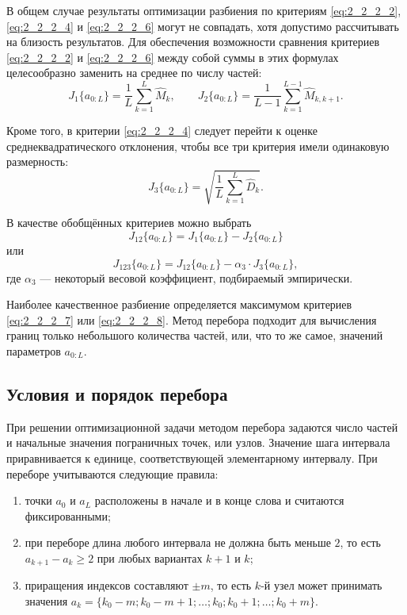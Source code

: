 В общем случае результаты оптимизации разбиения по критериям \eqref{eq:2_2_2_2}, \eqref{eq:2_2_2_4} и \eqref{eq:2_2_2_6} могут не совпадать, хотя допустимо рассчитывать на близость результатов.
Для обеспечения возможности сравнения критериев \eqref{eq:2_2_2_2} и \eqref{eq:2_2_2_6} между собой суммы в этих формулах целесообразно заменить на среднее по числу частей:
\begin{equation}
J_1\{a_{0:L}\} = \frac{1}{L} \sum_{k=1}^{L} \widehat{M}_k,\qquad
J_2\{a_{0:L}\} = \frac{1}{L-1} \sum_{k=1}^{L-1} \widehat{M}_{k,k+1}.
\end{equation}

Кроме того, в критерии \eqref{eq:2_2_2_4} следует перейти к оценке среднеквадратического отклонения, чтобы все три критерия имели одинаковую размерность:
\begin{equation}
J_3\{a_{0:L}\} = \sqrt{\frac{1}{L} \sum_{k=1}^{L} \widehat{D}_k}.
\end{equation}

В качестве обобщённых критериев можно выбрать
\begin{equation}\label{eq:2_2_2_7}
J_{12}\{a_{0:L}\} = J_1\{a_{0:L}\} - J_2\{a_{0:L}\}
\end{equation}
или
\begin{equation}\label{eq:2_2_2_8}
J_{123}\{a_{0:L}\} = J_{12}\{a_{0:L}\} - \alpha_3 \cdot J_3\{a_{0:L}\},
\end{equation}
где $\alpha_3$ --- некоторый весовой коэффициент, подбираемый эмпирически.

Наиболее качественное разбиение определяется максимумом критериев \eqref{eq:2_2_2_7} или \eqref{eq:2_2_2_8}.
Метод перебора подходит для вычисления границ только небольшого количества частей, или, что то же самое, значений параметров $a_{0:L}$.


\subsection{Условия и порядок перебора} \label{sect2_2_3}

При решении оптимизационной задачи методом перебора задаются число частей и начальные значения пограничных точек, или узлов.
Значение шага интервала приравнивается к единице, соответствующей элементарному интервалу.
При переборе учитываются следующие правила:
\begin{enumerate}[label={\arabic*)}]
	\item точки $a_0$ и $a_L$ расположены в начале и в конце слова и считаются фиксированными;
	\item при переборе длина любого интервала не должна быть меньше $2$, то есть $a_{k+1} - a_k \ge 2$ при любых вариантах $k+1$ и $k$;
	\item приращения индексов составляют $\pm m$, то есть $k$-й узел может принимать значения $a_k = \{k_0 - m; k_0 - m + 1; \dots; k_0; k_0 + 1; \dots; k_0 + m\}$.
\end{enumerate}


